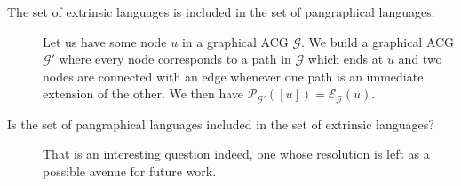 \begin{description}
  \vspace{0.5cm}

  \item[The set of extrinsic languages is included in the set of
    pangraphical languages.] \hfill

    Let us have some node $u$ in a graphical ACG $\mathcal{G}$. We build
    a graphical ACG $\mathcal{G}'$ where every node corresponds to a
    path in $\mathcal{G}$ which ends at $u$ and two nodes are connected
    with an edge whenever one path is an immediate extension of the
    other. We then have $\mathcal{P}_{\mathcal{G'}}([u]) =
    \mathcal{E}_{\mathcal{G}}(u)$.

  \vspace{0.5cm}

  \item[Is the set of pangraphical languages included in the set of
    extrinsic languages?] \hfill

    That is an interesting question indeed, one whose resolution is left
    as a possible avenue for future work.
\end{description}
